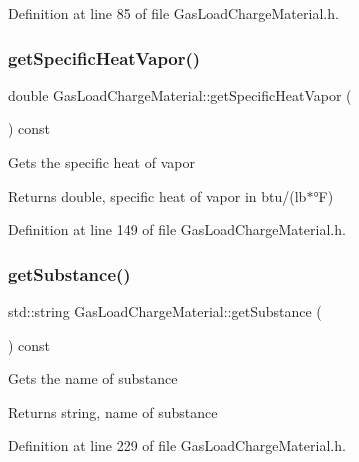 Definition at line 85 of file Gas\+Load\+Charge\+Material.\+h.

\mbox{\label{class_gas_load_charge_material_a9a07e86938bb831e51ac3f53f696a3c3}} 
\subsubsection{\texorpdfstring{get\+Specific\+Heat\+Vapor()}{getSpecificHeatVapor()}}
{\footnotesize\ttfamily double Gas\+Load\+Charge\+Material\+::get\+Specific\+Heat\+Vapor (\begin{DoxyParamCaption}{ }\end{DoxyParamCaption}) const\hspace{0.3cm}{\ttfamily [inline]}}

Gets the specific heat of vapor \begin{DoxyReturn}{Returns}
double, specific heat of vapor in btu/(lb$\ast$°F) 
\end{DoxyReturn}


Definition at line 149 of file Gas\+Load\+Charge\+Material.\+h.

\mbox{\label{class_gas_load_charge_material_a5f967841f196f6b0b35f32f9610092e3}} 
\subsubsection{\texorpdfstring{get\+Substance()}{getSubstance()}}
{\footnotesize\ttfamily std\+::string Gas\+Load\+Charge\+Material\+::get\+Substance (\begin{DoxyParamCaption}{ }\end{DoxyParamCaption}) const\hspace{0.3cm}{\ttfamily [inline]}}

Gets the name of substance \begin{DoxyReturn}{Returns}
string, name of substance 
\end{DoxyReturn}


Definition at line 229 of file Gas\+Load\+Charge\+Material.\+h.

